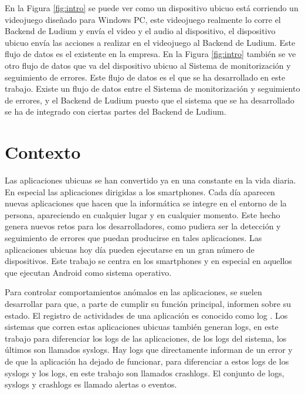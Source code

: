 En la Figura \ref{fig:intro} se puede ver como un dispositivo ubicuo está corriendo un videojuego diseñado para Windows PC, este videojuego realmente lo corre el Backend de Ludium y envía el video y el audio al dispositivo, el dispositivo ubicuo envía las acciones a realizar en el videojuego al Backend de Ludium. Este flujo de datos es el existente en la empresa. En la Figura \ref{fig:intro} también se ve otro flujo de datos que va del dispositivo ubicuo al Sistema de monitorización y seguimiento de errores. Este flujo de datos es el que se ha desarrollado en este trabajo. Existe un flujo de datos entre el Sistema de monitorización y seguimiento de errores, y el Backend de Ludium puesto que el sistema que se ha desarrollado se ha de integrado con ciertas partes del Backend de Ludium.

\section{Contexto}
Las aplicaciones ubicuas \cite{Tfg:ubiquitous} se han convertido ya en una constante en la vida diaria. En especial las aplicaciones dirigidas a los smartphones. Cada día aparecen nuevas aplicaciones que hacen que la informática se integre en el entorno de la persona, apareciendo en cualquier lugar y en cualquier momento. Este hecho genera nuevos retos para los desarrolladores, como pudiera ser la detección y seguimiento de errores que puedan producirse en tales aplicaciones. Las aplicaciones ubicuas hoy día pueden ejecutarse en un gran número de dispositivos. Este trabajo se centra en los smartphones y en especial en aquellos que ejecutan Android como sistema operativo.

Para controlar comportamientos anómalos en las aplicaciones, se suelen desarrollar para que, a parte de cumplir su función principal, informen sobre su estado. El registro de actividades de una aplicación es conocido como log \cite{Tfg:thelog}. Los sistemas que corren estas aplicaciones ubicuas también generan logs, en este trabajo para diferenciar los logs de las aplicaciones, de los logs del sistema, los últimos son llamados syslogs. Hay logs que directamente informan de un error y de que la aplicación ha dejado de funcionar, para diferenciar a estos logs de los syslogs y los logs, en este trabajo son llamados crashlogs. El conjunto de logs, syslogs y crashlogs es llamado alertas o eventos.

